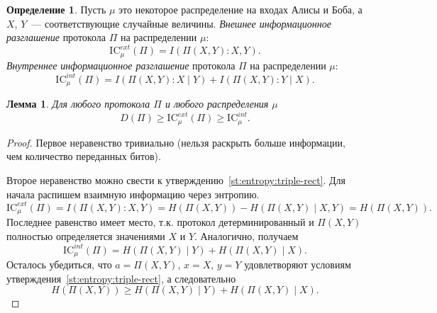 \documentclass[12pt]{article}
\newcommand{\IC}{\mathrm{IC}}
\theoremstyle{definition}
\newtheorem{definition}{Определение}[section]
\theoremstyle{plain}
\newtheorem{lemma}{Лемма}[section]
\theoremstyle{remark}
\begin{document}
\begin{definition}
    Пусть $\mu$ это некоторое распределение на входах Алисы и Боба,
    а $X$, $Y$~--- соответствующие случайные величины.
    \emph{Внешнее информационное разглашение} протокола $\Pi$ на распределении $\mu$:
    $$\IC_\mu^{ext}(\Pi) = I(\Pi(X,Y) : X, Y).$$
    \emph{Внутреннее информационное разглашение} протокола $\Pi$ на распределении $\mu$:
    $$\IC_\mu^{int}(\Pi) = I(\Pi(X,Y) : X \mid  Y) + I(\Pi(X,Y) : Y \mid X).$$
\end{definition}

\begin{lemma}
    Для любого протокола $\Pi$ и любого распределения $\mu$
    \[
    D(\Pi) \ge \IC_\mu^{ext}(\Pi) \ge \IC_\mu^{int}.
    \]
\end{lemma}
\begin{proof}
    Первое неравенство тривиально (нельзя раскрыть больше информации, 
    чем количество переданных битов).
    
    Второе неравенство можно свести к утверждению~\ref{st:entropy:triple-rect}. Для начала распишем взаимную информацию через энтропию.
    \[
        \IC_\mu^{ext}(\Pi) = I(\Pi(X,Y) : X, Y) = H(\Pi(X,Y)) - H(\Pi(X,Y)\mid X, Y) = H(\Pi(X,Y)).
    \]
    Последнее равенство имеет место, т.к. протокол детерминированный и $\Pi(X,Y)$ полностью определяется значениями $X$ и $Y$.
    Аналогично, получаем
    \[
        \IC_\mu^{int}(\Pi) = H(\Pi(X,Y) \mid  Y) + H(\Pi(X,Y) \mid X).
    \]
    Осталось убедиться, что $a = \Pi(X,Y)$, $x = X$, $y = Y$ удовлетворяют условиям утверждения~\ref{st:entropy:triple-rect},
    а следовательно 
    \[
        H(\Pi(X,Y)) \ge H(\Pi(X,Y) \mid  Y) + H(\Pi(X,Y) \mid X).
    \]        
\end{proof}
\end{document}
